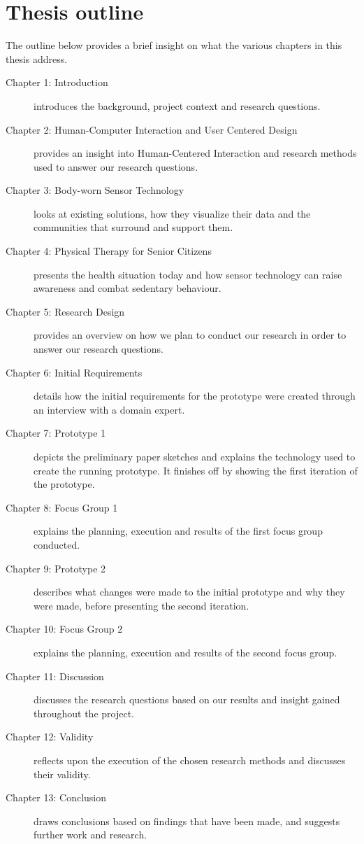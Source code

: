 \section{Thesis outline}
The outline below provides a brief insight on what the various chapters in this thesis address.

\begin{description}
  \item[Chapter 1: Introduction] introduces the background, project context and research questions.
  \item[Chapter 2: Human-Computer Interaction and User Centered Design] provides an insight into Human-Centered Interaction and research methods used to answer our research questions.
  \item[Chapter 3: Body-worn Sensor Technology] looks at existing solutions, how they visualize their data and the communities that surround and support them.
  \item[Chapter 4: Physical Therapy for Senior Citizens] presents the health situation today and how sensor technology can raise awareness and combat sedentary behaviour.
  \item[Chapter 5: Research Design] provides an overview on how we plan to conduct our research in order to answer our research questions.
  \item[Chapter 6: Initial Requirements] details how the initial requirements for the prototype were created through an interview with a domain expert.
  \item[Chapter 7: Prototype 1] depicts the preliminary paper sketches and explains the technology used to create the running prototype. It finishes off by showing the first iteration of the prototype.
  \item[Chapter 8: Focus Group 1] explains the planning, execution and results of the first focus group conducted.
  \item[Chapter 9: Prototype 2] describes what changes were made to the initial prototype and why they were made, before presenting the second iteration.
  \item[Chapter 10: Focus Group 2] explains the planning, execution and results of the second focus group.
  \item[Chapter 11: Discussion] discusses the research questions based on our results and insight gained throughout the project.
  \item[Chapter 12: Validity] reflects upon the execution of the chosen research methods and discusses their validity.
  \item[Chapter 13: Conclusion] draws conclusions based on findings that have been made, and suggests further work and research.
\end{description}
